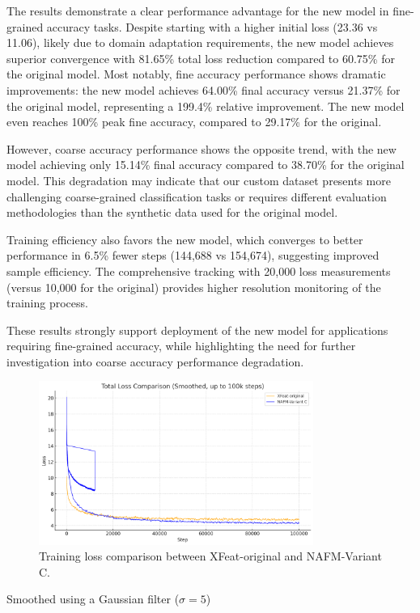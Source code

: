The results demonstrate a clear performance advantage for the new model in
fine-grained accuracy tasks. Despite starting with a higher initial loss (23.36
vs 11.06), likely due to domain adaptation requirements, the new model achieves
superior convergence with 81.65\% total loss reduction compared to 60.75\% for
the original model. Most notably, fine accuracy performance shows dramatic
improvements: the new model achieves 64.00\% final accuracy versus 21.37\% for
the original model, representing a 199.4\% relative improvement. The new model
even reaches 100\% peak fine accuracy, compared to 29.17\% for the original.

However, coarse accuracy performance shows the opposite trend, with the new
model achieving only 15.14\% final accuracy compared to 38.70\% for the
original model. This degradation may indicate that our custom dataset presents
more challenging coarse-grained classification tasks or requires different
evaluation methodologies than the synthetic data used for the original model.

Training efficiency also favors the new model, which converges to better
performance in 6.5\% fewer steps (144,688 vs 154,674), suggesting improved
sample efficiency. The comprehensive tracking with 20,000 loss measurements
(versus 10,000 for the original) provides higher resolution monitoring of the
training process.

These results strongly support deployment of the new model for applications
requiring fine-grained accuracy, while highlighting the need for further
investigation into coarse accuracy performance degradation.

\begin{figure}[H]
    \centering
    \includegraphics[width=0.8\textwidth]{ressources/comparative_losses.png}
    \caption{Training loss comparison between XFeat-original and NAFM-Variant C.}
    \label{fig:loss_comparison}
\end{figure}
{\footnotesize * Smoothed using a Gaussian filter ($\sigma=5$)\par}

